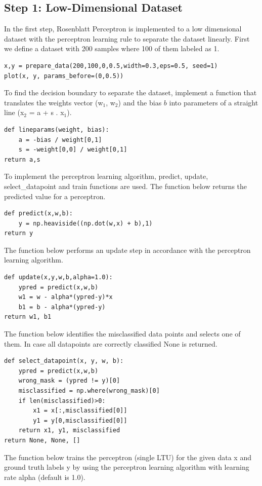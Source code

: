 \documentclass[onecolumn]{article}
\begin{document}
\subsection{Step 1: Low-Dimensional Dataset}

In the first step, Rosenblatt Perceptron is implemented to a low dimensional dataset with the perceptron learning rule to separate the dataset linearly.\newline
First we define a dataset with 200 samples where 100 of them labeled as 1.  \newline
\begin{lstlisting}
x,y = prepare_data(200,100,0,0.5,width=0.3,eps=0.5, seed=1)
plot(x, y, params_before=(0,0.5))  
\end{lstlisting}
To find the decision boundary to separate the dataset, implement a function that translates the weights vector (w$_{1}$, w$_{2}$) and the bias $b$  into parameters of a straight line (x$_{2}$ = a + s . x$_{1}$).
\begin{lstlisting}
def lineparams(weight, bias): 
	a = -bias / weight[0,1]
	s = -weight[0,0] / weight[0,1]  
return a,s
\end{lstlisting}
To implement the perceptron learning algorithm, predict, update, select\_datapoint and train functions are used.
The function below returns the predicted value for a perceptron.
\begin{lstlisting}
def predict(x,w,b): 
	y = np.heaviside((np.dot(w,x) + b),1)
return y
\end{lstlisting}
The function below performs an update step in accordance with the perceptron learning algorithm.
\begin{lstlisting}
def update(x,y,w,b,alpha=1.0): 
	ypred = predict(x,w,b)
	w1 = w - alpha*(ypred-y)*x
	b1 = b - alpha*(ypred-y)  
return w1, b1
\end{lstlisting}
The function below identifies the misclassified data points and selects one of them. In case all datapoints are correctly classified None is returned.
\begin{lstlisting}
def select_datapoint(x, y, w, b): 
	ypred = predict(x,w,b)
	wrong_mask = (ypred != y)[0]
	misclassified = np.where(wrong_mask)[0]
	if len(misclassified)>0:
		x1 = x[:,misclassified[0]]
		y1 = y[0,misclassified[0]]
	return x1, y1, misclassified
return None, None, []
\end{lstlisting}
The function below trains the perceptron (single LTU) for the given data x and ground truth labels y by using the perceptron learning algorithm with learning rate alpha (default is 1.0).
\end{document}
